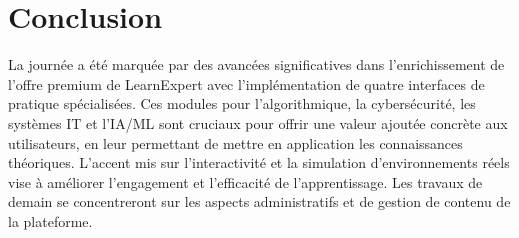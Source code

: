 \documentclass[12pt, a4paper]{article}
\begin{document}
\section{Conclusion}
La journée a été marquée par des avancées significatives dans l'enrichissement de l'offre premium de LearnExpert avec l'implémentation de quatre interfaces de pratique spécialisées. Ces modules pour l'algorithmique, la cybersécurité, les systèmes IT et l'IA/ML sont cruciaux pour offrir une valeur ajoutée concrète aux utilisateurs, en leur permettant de mettre en application les connaissances théoriques. L'accent mis sur l'interactivité et la simulation d'environnements réels vise à améliorer l'engagement et l'efficacité de l'apprentissage. Les travaux de demain se concentreront sur les aspects administratifs et de gestion de contenu de la plateforme.
\end{document}
